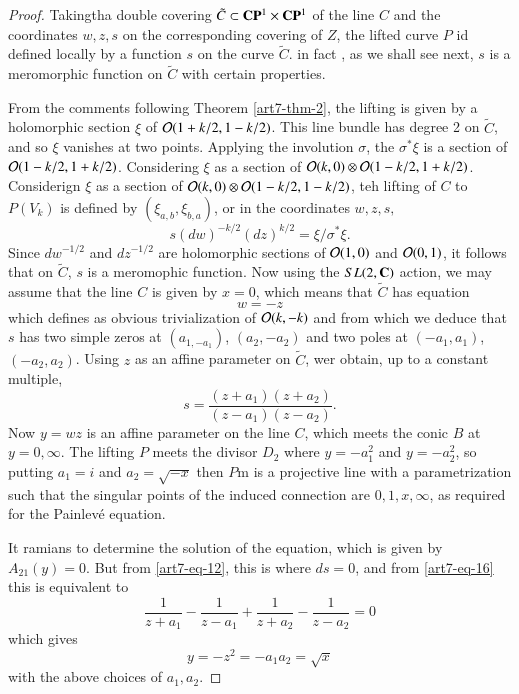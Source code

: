 \begin{proof}
Taking\pageoriginale tha double covering $\tilde{C} \subset \mathbf{C}\mathbf{P}^{1} \times \mathbf{C}\mathbf{P}^{1}$ of the line $C$ and the coordinates $w,z,s$ on the corresponding covering of $Z$, the lifted curve $P$ id defined locally by a function $s$ on the curve
$\tilde{C}$. in fact , as we shall see next, $s$ is a meromorphic function on $\tilde{C}$ with certain properties.

From the comments following Theorem \ref{art7-thm-2}, the lifting is given by a holomorphic section $\xi$ of $\mathcal{O}(1+k/2, 1-k/2)$. This line bundle has degree 2 on $\tilde{C}$, and so $\xi$ vanishes at two points. Applying the involution $\sigma$, the $\sigma^{*}\xi$ is a section of $\mathcal{O}(1-k/2, 1+k/2)$. Considering $\xi$ as a section of $\mathcal{O}(k,0)\otimes \mathcal{O}(1-k/2, 1+k/2)$. Considerign $\xi$ as a section of $\mathcal{O}(k, 0)\otimes \mathcal{O}(1-k/2, 1-k/2)$, teh lifting of $C$ to $P(V_{k})$ is defined by $(\xi_{a,b}, \xi_{b,a})$, or in the coordinates $w,z,s,$
\begin{equation*}\label{art7-eq-15}
s(dw)^{-k/2}(dz)^{k/2} = \xi/\sigma^{*}\xi.\tag{15}
\end{equation*}
Since $dw^{-1/2}$ and $dz^{-1/2}$ are holomorphic sections of $\mathcal{O}(1,0)$ and $\mathcal{O}(0,1)$, it follows that on $\tilde{C}$, $s$ is a meromophic function. Now using the $SL(2, \mathbf{C})$ action, we may assume that the line $C$ is given by $x=0$, which means that $\tilde{C}$ has equation
$$
w= -z
$$
which defines as obvious trivialization of $\mathcal{O}(k,-k)$ and from which we deduce that $s$ has  two simple zeros at $(a_{1,-a_{1}})$, $(a_{2}, -a_{2})$ and two poles at $(-a_{1}, a_{1})$, $(-a_{2}, a_{2})$. Using $z$ as an affine parameter on $\tilde{C}$, wer obtain, up to a constant multiple,
\begin{equation*}\label{art7-eq-16}
s = \dfrac{(z+a_{1})(z+a_{2})}{(z-a_{1})(z-a_{2})}.\tag{16}
\end{equation*}
Now $y = wz$ is an affine parameter on the line $C$, which meets the conic $B$ at $y= 0, \infty$. The lifting $P$ meets the divisor $D_{2}$ where $y=-a_{1}^{2}$ and $y=-a_{2}^{2}$, so putting $a_{1}=i$ and $a_{2}=\sqrt{-x}$ then $P$m is a projective line with a parametrization such that the singular points of the induced connection are $0,1,x, \infty$, as required for the Painlev\'e equation.

It ramians to determine the solution of the equation, which is given by $A_{21}(y)=0$. But from \eqref{art7-eq-12}, this is where $ds=0$, and from \eqref{art7-eq-16} this is equivalent to
$$
\dfrac{1}{z+a_{1}}- \dfrac{1}{z-a_{1}}+\dfrac{1}{z+a_{2}}-\dfrac{1}{z-a_{2}} =0
$$
which gives
$$
y=-z^{2} = -a_{1}a_{2}= \sqrt{x}
$$
with the above choices of $a_{1}, a_{2}$.
\end{proof}


